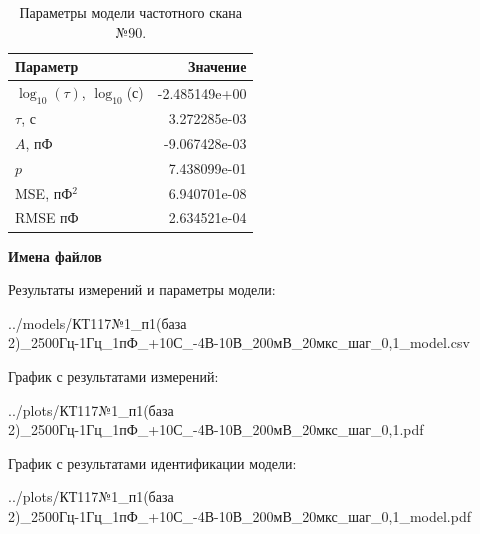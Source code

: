 \begin{table}[!ht]
    \centering
    \caption{Параметры модели частотного скана №90.}
    \begin{tabular}{|l|r|}
        \hline
        Параметр                                       & Значение                  \\ \hline
        $\log_{10}(\tau)$, $\log_{10}$(с)              & -2.485149e+00             \\ \hline
        $\tau$, с                                      & 3.272285e-03              \\ \hline
        $A$, пФ                                        & -9.067428e-03             \\ \hline
        $p$                                            & 7.438099e-01              \\ \hline
        MSE, пФ$^2$                                    & 6.940701e-08              \\ \hline
        RMSE пФ                                        & 2.634521e-04              \\ \hline
    \end{tabular}
    \label{table:frequency_scan_model_90}
\end{table}

\textbf{Имена файлов}

Результаты измерений и параметры модели:

\scriptsize../models/КТ117№1\_п1(база 2)\_2500Гц-1Гц\_1пФ\_+10С\_-4В-10В\_200мВ\_20мкс\_шаг\_0,1\_model.csv
\normalsize

График с результатами измерений:

\scriptsize../plots/КТ117№1\_п1(база 2)\_2500Гц-1Гц\_1пФ\_+10С\_-4В-10В\_200мВ\_20мкс\_шаг\_0,1.pdf
\normalsize

График с результатами идентификации модели:

\scriptsize../plots/КТ117№1\_п1(база 2)\_2500Гц-1Гц\_1пФ\_+10С\_-4В-10В\_200мВ\_20мкс\_шаг\_0,1\_model.pdf
\normalsize

